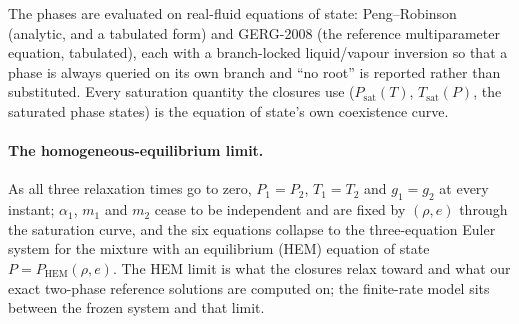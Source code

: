 \documentclass[11pt,a4paper]{article}
\begin{document}
The phases are evaluated on real-fluid equations of state: Peng--Robinson
(analytic, and a tabulated form) and GERG-2008 (the reference
multiparameter equation, tabulated), each with a branch-locked
liquid/vapour inversion so that a phase is always queried on its own
branch and ``no root'' is reported rather than substituted.  Every
saturation quantity the closures use ($P_{\mathrm{sat}}(T)$,
$T_{\mathrm{sat}}(P)$, the saturated phase states) is the equation of
state's own coexistence curve.

\paragraph{The homogeneous-equilibrium limit.}  As all three relaxation
times go to zero, $P_1 = P_2$, $T_1 = T_2$ and $g_1 = g_2$ at every
instant; $\alpha_1$, $m_1$ and $m_2$ cease to be independent and are
fixed by $(\rho, e)$ through the saturation curve, and the six equations
collapse to the three-equation Euler system for the mixture with an
equilibrium (HEM) equation of state $P = P_{\mathrm{HEM}}(\rho, e)$.  The
HEM limit is what the closures relax toward and what our exact
two-phase reference solutions are computed on; the finite-rate model
sits between the frozen system and that limit.
\end{document}
